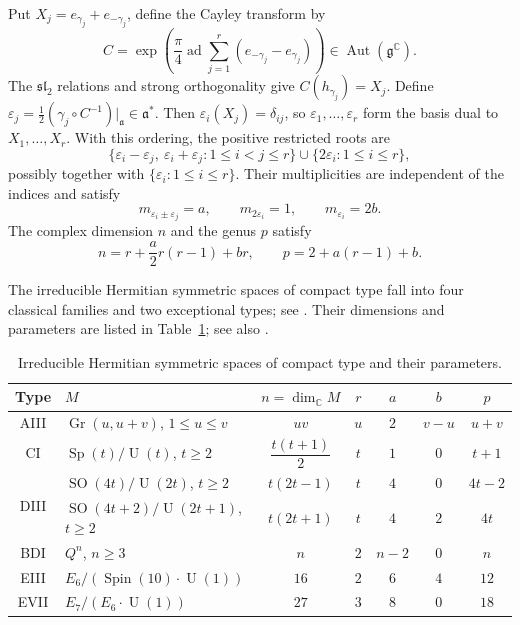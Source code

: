 \documentclass[11pt,reqno]{amsart}
\theoremstyle{corollary}
\theoremstyle{conjecture}
\theoremstyle{assumption}
\theoremstyle{proposition}
\theoremstyle{remark}
\numberwithin{equation}{section}
\begin{document}
Put $X_j=e_{\gamma_j}+e_{-\gamma_j}$, define the Cayley transform by
\[
C=\exp\left(\frac{\pi}{4}\operatorname{ad}\sum_{j=1}^r(e_{-\gamma_j}-e_{\gamma_j})\right)\in\operatorname{Aut}(\mathfrak g^{\mathbb C}).
\]
The $\mathfrak{sl}_2$ relations and strong orthogonality give $C(h_{\gamma_j})=X_j$. Define $\varepsilon_j=\frac12(\gamma_j\circ C^{-1})\big|_{\mathfrak a}\in\mathfrak a^*$. Then $\varepsilon_i(X_j)=\delta_{ij}$, so $\varepsilon_1,\ldots,\varepsilon_r$ form the basis dual to $X_1,\ldots,X_r$. With this ordering, the positive restricted roots are
\[
\{\varepsilon_i-\varepsilon_j,\ \varepsilon_i+\varepsilon_j\colon1\leq i<j\leq r\}\cup\{2\varepsilon_i\colon1\leq i\leq r\},
\]
possibly together with $\{\varepsilon_i\colon1\leq i\leq r\}$. Their multiplicities are independent of the indices and satisfy
\[
m_{\varepsilon_i\pm\varepsilon_j}=a,\qquad m_{2\varepsilon_i}=1,\qquad m_{\varepsilon_i}=2b.
\]
The complex dimension $n$ and the genus $p$ satisfy
\[
n=r+\frac{a}{2}r(r-1)+br,\qquad p=2+a(r-1)+b.
\]

The irreducible Hermitian symmetric spaces of compact type fall into four classical families and two exceptional types; see \cite[Chapter~X, \S6.3]{Helgason1978}. Their dimensions and parameters are listed in Table~\ref{tab:chss}; see also \cite[Example~3.3]{Ding2022}.

\begin{table}[H]
\centering
\renewcommand{\arraystretch}{1.3}
\begin{tabular}{c|l|ccccc}
\hline
Type & $M$ & $n=\dim_{\mathbb C}M$ & $r$ & $a$ & $b$ & $p$ \\
\hline
AIII & $\operatorname{Gr}(u,u+v)$, $1\le u\le v$
& $uv$ & $u$ & $2$ & $v-u$ & $u+v$ \\
\hline
CI & $\operatorname{Sp}(t)/\operatorname{U}(t)$, $t\ge2$
& $\dfrac{t(t+1)}2$ & $t$ & $1$ & $0$ & $t+1$ \\
\hline
\multirow{2}{*}{DIII}
& $\operatorname{SO}(4t)/\operatorname{U}(2t)$, $t\ge2$
& $t(2t-1)$ & $t$ & $4$ & $0$ & $4t-2$ \\
& $\operatorname{SO}(4t+2)/\operatorname{U}(2t+1)$, $t\ge2$
& $t(2t+1)$ & $t$ & $4$ & $2$ & $4t$ \\
\hline
BDI & $Q^n$, $n\ge3$
& $n$ & $2$ & $n-2$ & $0$ & $n$ \\
\hline
EIII & $E_6/(\operatorname{Spin}(10)\cdot\operatorname{U}(1))$
& $16$ & $2$ & $6$ & $4$ & $12$ \\
\hline
EVII & $E_7/(E_6\cdot\operatorname{U}(1))$
& $27$ & $3$ & $8$ & $0$ & $18$ \\
\hline
\end{tabular}
\caption{Irreducible Hermitian symmetric spaces of compact type and their parameters.}
\label{tab:chss}
\end{table}
\end{document}
